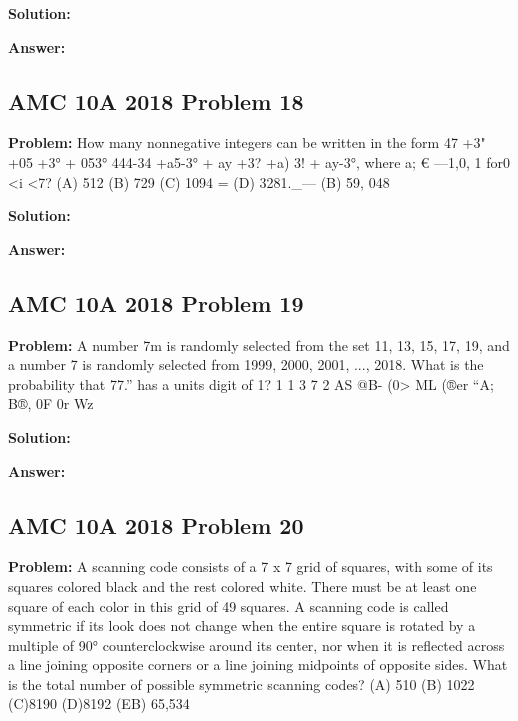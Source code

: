 \documentclass{article}
\newenvironment{problem}{\textbf{Problem: }}{\\}
\newenvironment{solution}{\textbf{Solution: }}{\\}
\newenvironment{answer}{\textbf{Answer: }}{\\}
\begin{document}
\begin{solution}
\end{solution}

\begin{answer}
\end{answer}

\subsection{AMC 10A 2018 Problem 18}

\begin{problem}
How many nonnegative integers can be written in the form 47 +3" +05 +3° + 053° 444-34 +a5-3° + ay +3? +a) 3! + ay-3°, where a; € {—1,0, 1} for0 <i <7? (A) 512 (B) 729 (C) 1094 = (D) 3281._— (B) 59, 048
\end{problem}

\begin{solution}
\end{solution}

\begin{answer}
\end{answer}

\subsection{AMC 10A 2018 Problem 19}

\begin{problem}
A number 7m is randomly selected from the set {11, 13, 15, 17, 19}, and a number 7 is randomly selected from {1999, 2000, 2001, ..., 2018}. What is the probability that 77.” has a units digit of 1? 1 1 3 7 2 AS @B- (0> ML (®er “A; B®, 0F 0r Wz
\end{problem}

\begin{solution}
\end{solution}

\begin{answer}
\end{answer}

\subsection{AMC 10A 2018 Problem 20}

\begin{problem}
A scanning code consists of a 7 x 7 grid of squares, with some of its squares colored black and the rest colored white. There must be at least one square of each color in this grid of 49 squares. A scanning code is called symmetric if its look does not change when the entire square is rotated by a multiple of 90° counterclockwise around its center, nor when it is reflected across a line joining opposite corners or a line joining midpoints of opposite sides. What is the total number of possible symmetric scanning codes? (A) 510 (B) 1022 (C)8190 (D)8192 (EB) 65,534
\end{problem}
\end{document}
